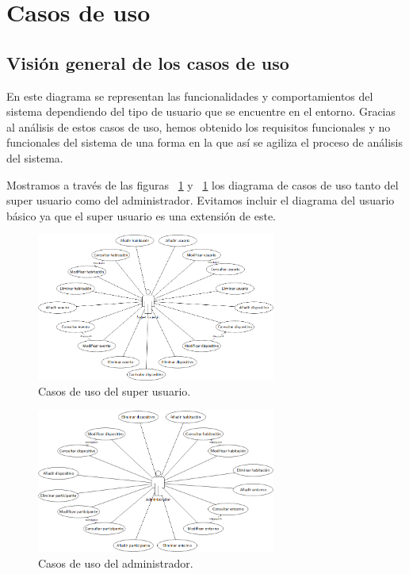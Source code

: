 \section{Casos de uso}
\subsection{Visi\'on general de los casos de uso}
En este diagrama se representan las funcionalidades y comportamientos del sistema dependiendo del tipo de usuario que se encuentre en el entorno. Gracias al an\'alisis de estos casos de uso, hemos obtenido los requisitos funcionales y no funcionales del sistema de una forma en la que as\'i se agiliza el proceso de an\'alisis del sistema.
 
Mostramos a trav\'es de las figuras ~\ref{fig:cuSuperusuario} y ~\ref{fig:cuSuperusuario} los diagrama de casos de uso tanto del super usuario como del administrador. Evitamos incluir el diagrama del usuario b\'asico ya que el super usuario es una extensi\'on de este.

\begin{figure}[h!]
	\centering
	\includegraphics[width=0.7\textwidth]{4.Disenio/Imagenes/CU-Superusuario}
	\caption{Casos de uso del super usuario.}
	\label{fig:cuSuperusuario}
\end{figure}

\begin{figure}[h!]
	\centering
	\includegraphics[width=0.7\textwidth]{4.Disenio/Imagenes/CU-Admin}
	\caption{Casos de uso del administrador.}
	\label{fig:cuAdmin}
\end{figure}


